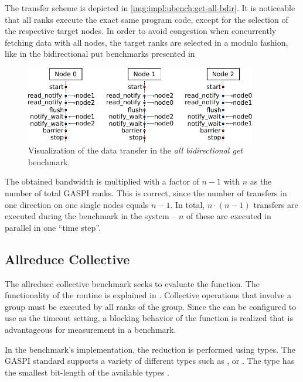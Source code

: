 The transfer scheme is depicted in \autoref{img:impl:ubench:get-all-bdir}. It is noticeable that all ranks execute the exact same program code, except for the selection of the respective target nodes. In order to avoid congestion when concurrently fetching data with all nodes, the target ranks are selected in a modulo fashion, like in the bidirectional put benchmarks presented in 

\begin{figure}[htb]
\centering
\includegraphics[width=0.9\textwidth]{img/bench-get-all-bdir}
\caption{Visualization of the data transfer in the \emph{all bidirectional get} benchmark.}
\label{img:impl:ubench:get-all-bdir}
\end{figure}

The obtained bandwidth is multiplied with a factor of $n-1$ with $n$ as the number of total \ac{GASPI} ranks. This is correct, since the number of transfers in one direction on one single nodes equals $n-1$. In total, $n\cdot (n-1)$ transfers are executed during the benchmark in the system -- $n$ of these are executed in parallel  in one \enquote{time step}.


\subsection{Allreduce Collective}

The allreduce collective benchmark seeks to evaluate the \gaspiAllreduce function. The functionality of the \gaspiAllreduce routine is explained in . Collective operations  that involve a group must be executed by all ranks of the group. Since the \gaspiAllreduce can be configured to use  as the timeout setting, a blocking behavior of the function is realized that is advantageous for measurement in a benchmark.

In the benchmark's implementation, the reduction is performed using  types. The \ac{GASPI} standard supports a variety of different types such as ,  or . The  type has the smallest bit-length of the available types \cite[ch.~11.3.3]{gaspi-std}.

